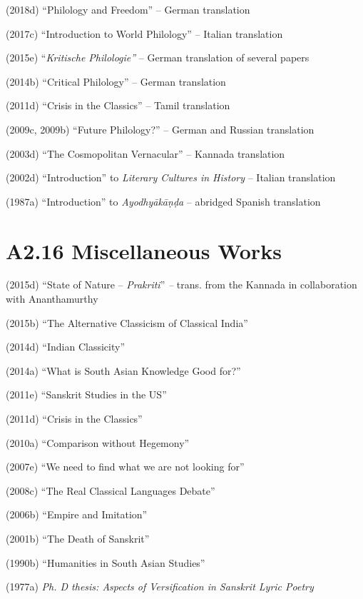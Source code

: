 (2018d) “Philology and Freedom” – German translation

(2017c) “Introduction to World Philology” – Italian translation

(2015e) “\textit{Kritische Philologie”} – German translation of several  papers

(2014b) “Critical Philology” – German translation

(2011d) “Crisis in the Classics” – Tamil translation

(2009c, 2009b) “Future Philology?” – German and Russian translation

(2003d) “The Cosmopolitan Vernacular” – Kannada translation

(2002d) “Introduction” to \textit{Literary Cultures in History} – Italian translation

(1987a) “Introduction” to \textit{Ayodhyākāṇḍa} – abridged Spanish translation

\vspace{-.3cm}

\section*{A2.16 Miscellaneous Works}

(2015d) “State of Nature – \textit{Prakriti}”\textit{ –} trans. from the Kannada in collaboration with Ananthamurthy

(2015b) “The Alternative Classicism of Classical India”

(2014d) “Indian Classicity”

(2014a) “What is South Asian Knowledge Good for?”

(2011e) “Sanskrit Studies in the US”

(2011d) “Crisis in the Classics”

(2010a) “Comparison without Hegemony”

(2007e) “We need to find what we are not looking for”

(2008c) “The Real Classical Languages Debate”

(2006b) “Empire and Imitation”

(2001b) “The Death of Sanskrit”

(1990b) “Humanities in South Asian Studies”

(1977a) \textit{Ph. D thesis: Aspects of Versification in Sanskrit Lyric Poetry}

